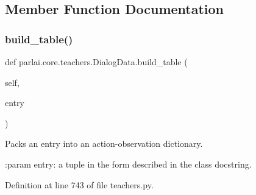\subsection{Member Function Documentation}
\mbox{\label{classparlai_1_1core_1_1teachers_1_1DialogData_a467bf261c35da2f5d2a34949281d2669}} 
\subsubsection{\texorpdfstring{build\+\_\+table()}{build\_table()}}
{\footnotesize\ttfamily def parlai.\+core.\+teachers.\+Dialog\+Data.\+build\+\_\+table (\begin{DoxyParamCaption}\item[{}]{self,  }\item[{}]{entry }\end{DoxyParamCaption})}

\begin{DoxyVerb}Packs an entry into an action-observation dictionary.

:param entry: a tuple in the form described in the class docstring.
\end{DoxyVerb}
 

Definition at line 743 of file teachers.\+py.


